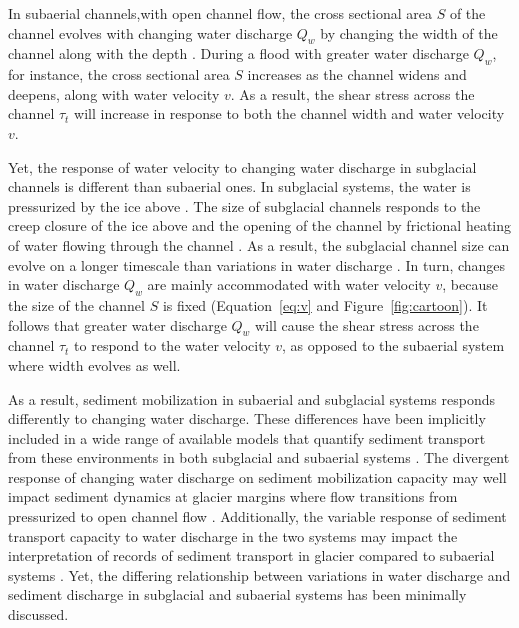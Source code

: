 \documentclass[11pt]{article}
\begin{document}
\begin{spacing}{1}
  In subaerial channels,with open channel flow, the cross sectional area $S$ of the channel evolves with changing water discharge $Q_w$  by changing the width of the channel along with the depth \citep{leopold1953}. During a flood with greater water discharge $Q_w$, for instance, the cross sectional area $S$ increases as the channel widens and deepens, along with water velocity $v$. As a result, the shear stress across the channel $\tau_t$ will increase in response to both the channel width  and water velocity $v$. 

  Yet, the response of water velocity to changing water discharge in subglacial channels is different than subaerial ones.
  In subglacial systems, the water is pressurized by the ice above \citep{shreve1972}.
  The size of subglacial channels responds to the creep closure of the ice above and the opening of the channel by frictional heating of water flowing through the channel \citep{rothlisberger1972}.
  As a result, the subglacial channel size can evolve on a longer timescale than variations in water discharge \citep[e.g.][]{iken1986,andrews2014,nanni2020}.
  In turn, changes in water discharge $Q_w$ are mainly accommodated with water velocity $v$, because the size of the channel $S$ is fixed (Equation~\ref{eq:v} and Figure~\ref{fig:cartoon}).
  It follows that greater water discharge $Q_w$ will cause the shear stress across the channel $\tau_t$ to respond to the water velocity $v$, as opposed to the subaerial system where width evolves as well. 

  As a result, sediment mobilization in subaerial and subglacial systems responds differently to changing water discharge.
  These differences have been implicitly included in a wide range of available models that  quantify sediment transport from these environments in both subglacial and subaerial systems  \citep[e.g.][]{walder1994,tucker1997,creyts2013,wickert2019,hewitt2019}.
  The divergent response of changing water discharge on sediment mobilization capacity may well impact sediment dynamics at glacier margins where flow transitions from pressurized to open channel flow \citep[e.g.][]{lane2016}.
  Additionally, the variable response of sediment transport capacity to water discharge in the two systems may impact the interpretation of records of sediment transport in glacier compared to subaerial systems \citep[e.g.][]{muller1968,richards2003,ganti2016}.
  Yet, the differing relationship between variations in water discharge and sediment discharge in subglacial and subaerial systems has been minimally discussed.
  

\end{spacing}
\end{document}
